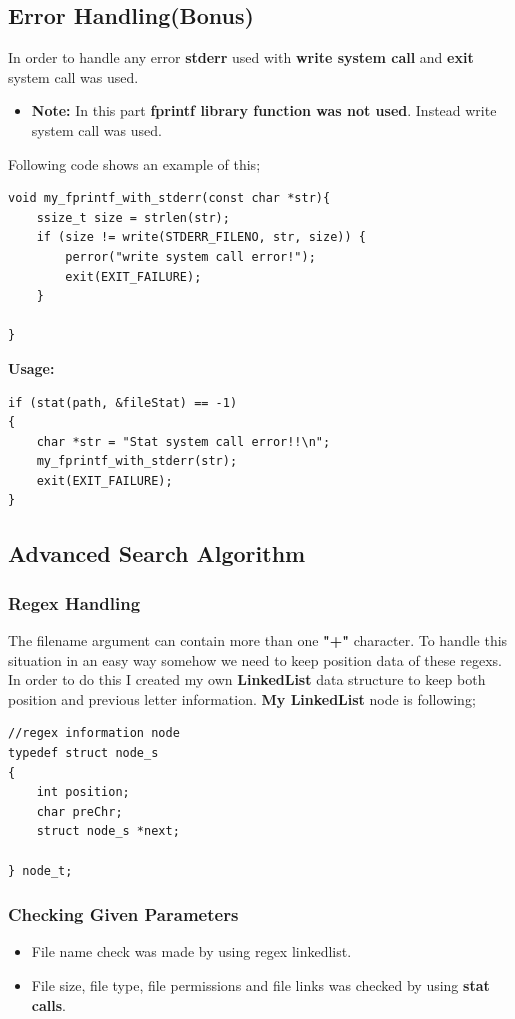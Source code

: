 \documentclass{article}
\begin{document}
\subsection{Error Handling(Bonus)}
In order to handle any error \textbf{stderr} used with \textbf{write system call} and \textbf{exit} system call was used.
\begin{itemize}
	\item \textbf{Note:} In this part \textbf{fprintf library function was not used}. Instead write system call was used.
\end{itemize}
Following code shows an example of this;
\begin{lstlisting}[style=CStyle]
void my_fprintf_with_stderr(const char *str){
    ssize_t size = strlen(str);
    if (size != write(STDERR_FILENO, str, size)) {
        perror("write system call error!");
        exit(EXIT_FAILURE);
    }

}
\end{lstlisting}
\textbf{Usage:}
\begin{lstlisting}[style=CStyle]
if (stat(path, &fileStat) == -1)
{
    char *str = "Stat system call error!!\n";
    my_fprintf_with_stderr(str);
    exit(EXIT_FAILURE);
}   
\end{lstlisting}
\subsection{Advanced Search Algorithm}
\subsubsection{Regex Handling}
The filename argument can contain more than one \textbf{"+"} character. To handle this situation in an easy way somehow we need to keep position data of these regexs. In order to do this I created my own \textbf{LinkedList} data structure to keep both position and previous letter information. \textbf{My LinkedList} node is following;
\begin{lstlisting}[style=CStyle]
//regex information node
typedef struct node_s
{
    int position;
    char preChr;
    struct node_s *next;

} node_t;
\end{lstlisting}
\subsubsection{Checking Given Parameters}
\begin{itemize}
	\item File name check was made by using regex linkedlist.
	\item File size, file type, file permissions and file links was checked by using \textbf{stat calls}. 
\end{itemize}
\end{document}
